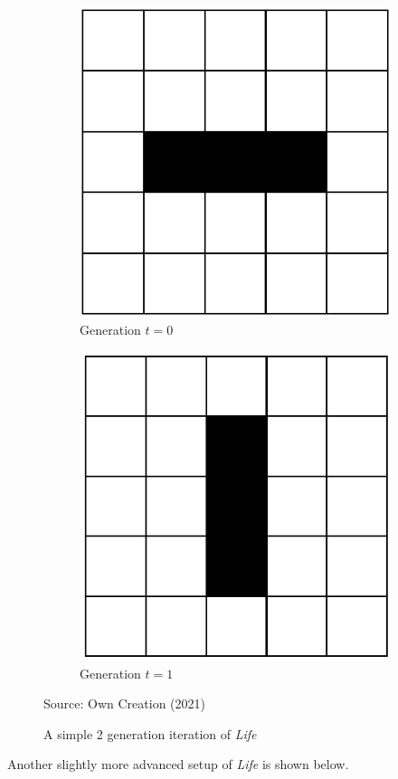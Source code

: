 \begin{figure}[H]
\centering
\begin{subfigure}{.5\textwidth}
  \centering
  \includegraphics[width=.4\linewidth]{Figures/blink1.png}
  \caption{Generation $t = 0$}
\end{subfigure}%
\begin{subfigure}{.5\textwidth}
  \centering
  \includegraphics[width=.4\linewidth]{Figures/blink2.png}
  \caption{Generation $t = 1$}
\end{subfigure}
\caption{A simple 2 generation iteration of \textsl{Life}}
\begin{center}
Source: Own Creation (2021)
\end{center}
\end{figure}
Another slightly more advanced setup of \textsl{Life} is shown below.
